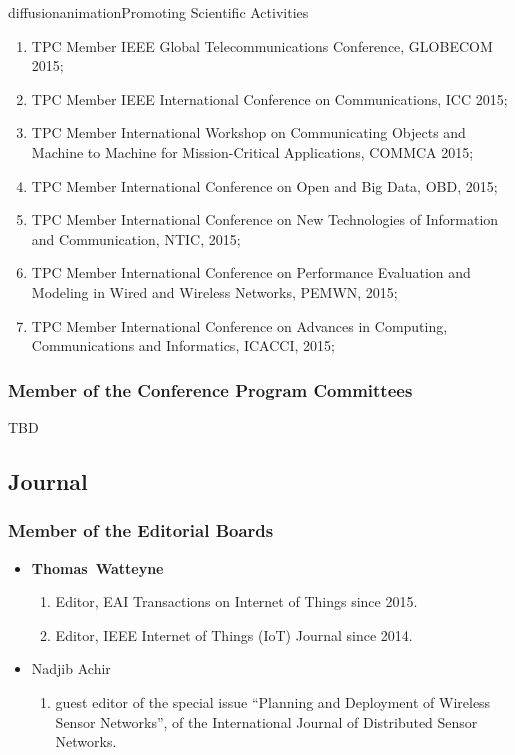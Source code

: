 \documentclass{ra2016}
\newcommand{\thomas}  {\textbf{Thomas~Watteyne}}
\begin{document}
\begin{module}{diffusion}{animation}{Promoting Scientific Activities}
\begin{itemize}
\begin{enumerate}
            \item TPC Member IEEE Global Telecommunications Conference, GLOBECOM 2015;
            \item TPC Member IEEE International Conference on Communications, ICC 2015;
            \item TPC Member International Workshop on Communicating Objects and Machine to Machine for Mission-Critical Applications, COMMCA 2015;
            \item TPC Member International Conference on Open and Big Data, OBD, 2015;
						\item TPC Member International Conference on New Technologies of Information and Communication, NTIC, 2015;
						\item TPC Member International Conference on Performance Evaluation and Modeling in Wired and Wireless Networks, PEMWN, 2015;
						\item TPC Member International Conference on Advances in Computing, Communications and Informatics, ICACCI, 2015;
        \end{enumerate}
    
\end{itemize}

    
    \subsubsection{Member of the Conference Program Committees}
    
    TBD 

    
\subsection{Journal}
    \subsubsection{Member of the Editorial Boards}
    \begin{itemize}
    \item \thomas
        \begin{enumerate}
            \item Editor, EAI Transactions on Internet of Things since 2015.
            \item Editor, IEEE Internet of Things (IoT) Journal since 2014.
        \end{enumerate}
    \item Nadjib Achir
        \begin{enumerate}
            \item guest editor  of the special issue ``Planning and Deployment of Wireless Sensor Networks'', of the International Journal of Distributed Sensor Networks.
        \end{enumerate}
\end{itemize}


\end{module}
\end{document}
